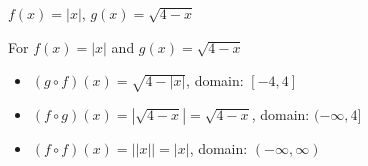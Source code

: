 {$f(x) = |x|$, $g(x) = \sqrt{4-x}$}
{ For   $f(x) = |x|$ and $g(x) = \sqrt{4-x}$

\begin{itemize}

\item  $(g \circ f)(x) = \sqrt{4-|x|}$, domain: $[-4,4]$

\item  $(f \circ g)(x) =|\sqrt{4-x}| = \sqrt{4-x}$, domain: $(-\infty, 4]$

\item  $(f \circ f)(x) = | |x| | = |x|$, domain: $(-\infty, \infty)$

\end{itemize}}